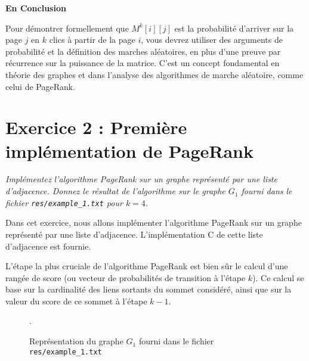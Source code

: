 \textbf{En Conclusion}

Pour démontrer formellement que $M^k[i][j]$ est la probabilité d'arriver sur la page $j$ en $k$ clics à partir de la page $i$, vous devrez utiliser des arguments de probabilité et la définition des marches aléatoires, en plus d'une preuve par récurrence sur la puissance de la matrice. C'est un concept fondamental en théorie des graphes et dans l'analyse des algorithmes de marche aléatoire, comme celui de PageRank.

\section{Exercice 2 : Première implémentation de PageRank}

\textit{Implémentez l'algorithme PageRank sur un graphe représenté par une liste d'adjacence. Donnez le résultat de l'algorithme sur le graphe $G_1$ fourni dans le fichier \texttt{res/example\_1.txt} pour $k = 4$.}

Dans cet exercice, nous allons implémenter l'algorithme PageRank sur un graphe représenté par une liste d'adjacence. L'implémentation C de cette liste d'adjacence est fournie.

L'étape la plus cruciale de l'algorithme PageRank est bien sûr le calcul d'une rangée de score (ou vecteur de probabilités de transition à l'étape $k$). Ce calcul se base sur la cardinalité des liens sortants du sommet considéré, ainsi que sur la valeur du score de ce sommet à l'étape $k-1$.

\begin{figure}
    \centering
    \caption{Représentation du graphe $G_1$ fourni dans le fichier \texttt{res/example\_1.txt}}.
    \label{fig:graph_g1}
\end{figure}


